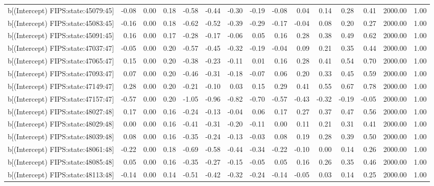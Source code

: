 \begin{table}[ht]
\begin{tabular}{rrrrrrrrrrrrrrr}
  b[(Intercept) FIPS:state:45079:45] & -0.08 & 0.00 & 0.18 & -0.58 & -0.44 & -0.30 & -0.19 & -0.08 & 0.04 & 0.14 & 0.28 & 0.41 & 2000.00 & 1.00 \\ 
  b[(Intercept) FIPS:state:45083:45] & -0.16 & 0.00 & 0.18 & -0.62 & -0.52 & -0.39 & -0.29 & -0.17 & -0.04 & 0.08 & 0.20 & 0.27 & 2000.00 & 1.00 \\ 
  b[(Intercept) FIPS:state:45091:45] & 0.16 & 0.00 & 0.17 & -0.28 & -0.17 & -0.06 & 0.05 & 0.16 & 0.28 & 0.38 & 0.49 & 0.62 & 2000.00 & 1.00 \\ 
  b[(Intercept) FIPS:state:47037:47] & -0.05 & 0.00 & 0.20 & -0.57 & -0.45 & -0.32 & -0.19 & -0.04 & 0.09 & 0.21 & 0.35 & 0.44 & 2000.00 & 1.00 \\ 
  b[(Intercept) FIPS:state:47065:47] & 0.15 & 0.00 & 0.20 & -0.38 & -0.23 & -0.11 & 0.01 & 0.16 & 0.28 & 0.41 & 0.54 & 0.70 & 2000.00 & 1.00 \\ 
  b[(Intercept) FIPS:state:47093:47] & 0.07 & 0.00 & 0.20 & -0.46 & -0.31 & -0.18 & -0.07 & 0.06 & 0.20 & 0.33 & 0.45 & 0.59 & 2000.00 & 1.00 \\ 
  b[(Intercept) FIPS:state:47149:47] & 0.28 & 0.00 & 0.20 & -0.21 & -0.10 & 0.03 & 0.15 & 0.29 & 0.41 & 0.55 & 0.67 & 0.78 & 2000.00 & 1.00 \\ 
  b[(Intercept) FIPS:state:47157:47] & -0.57 & 0.00 & 0.20 & -1.05 & -0.96 & -0.82 & -0.70 & -0.57 & -0.43 & -0.32 & -0.19 & -0.05 & 2000.00 & 1.00 \\ 
  b[(Intercept) FIPS:state:48027:48] & 0.17 & 0.00 & 0.16 & -0.24 & -0.13 & -0.04 & 0.06 & 0.17 & 0.27 & 0.37 & 0.47 & 0.56 & 2000.00 & 1.00 \\ 
  b[(Intercept) FIPS:state:48029:48] & 0.00 & 0.00 & 0.16 & -0.41 & -0.31 & -0.20 & -0.11 & 0.00 & 0.11 & 0.21 & 0.31 & 0.41 & 2000.00 & 1.00 \\ 
  b[(Intercept) FIPS:state:48039:48] & 0.08 & 0.00 & 0.16 & -0.35 & -0.24 & -0.13 & -0.03 & 0.08 & 0.19 & 0.28 & 0.39 & 0.50 & 2000.00 & 1.00 \\ 
  b[(Intercept) FIPS:state:48061:48] & -0.22 & 0.00 & 0.18 & -0.69 & -0.58 & -0.44 & -0.34 & -0.22 & -0.10 & 0.00 & 0.14 & 0.26 & 2000.00 & 1.00 \\ 
  b[(Intercept) FIPS:state:48085:48] & 0.05 & 0.00 & 0.16 & -0.35 & -0.27 & -0.15 & -0.05 & 0.05 & 0.16 & 0.26 & 0.35 & 0.46 & 2000.00 & 1.00 \\ 
  b[(Intercept) FIPS:state:48113:48] & -0.14 & 0.00 & 0.14 & -0.51 & -0.42 & -0.32 & -0.24 & -0.14 & -0.05 & 0.03 & 0.14 & 0.25 & 2000.00 & 1.00 \\ 

\end{tabular}
\end{table}
